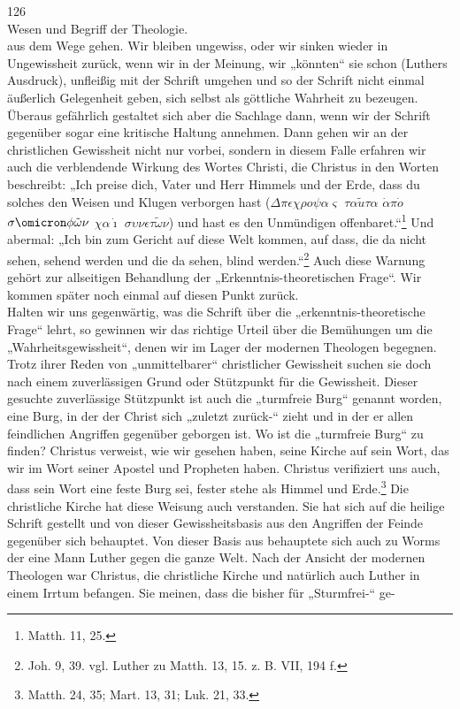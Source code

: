 126 \\ Wesen und Begriff der Theologie.\\ aus dem Wege gehen. Wir bleiben ungewiss, oder wir sinken wieder in Ungewissheit zurück, wenn wir in der Meinung, wir „könnten“ sie schon (Luthers Ausdruck), unfleißig mit der Schrift umgehen und so der Schrift nicht einmal äußerlich Gelegenheit geben, sich selbst als göttliche Wahrheit zu bezeugen. Überaus gefährlich gestaltet sich aber die Sachlage dann, wenn wir der Schrift gegenüber sogar eine kritische Haltung annehmen. Dann gehen wir an der christlichen Gewissheit nicht nur vorbei, sondern in diesem Falle erfahren wir auch die verblendende Wirkung des Wortes Christi, die Christus in den Worten beschreibt: „Ich preise dich, Vater und Herr Himmels und der Erde, dass du solches den Weisen und Klugen verborgen hast ($\Delta\pi\epsilon\chi\rho o\psi\alpha\varsigma$ $\tau\alpha\tilde{u}\tau\alpha$ $\dot{\alpha}\pi\dot{o}$ $\sigma\omicron\phi\tilde{\omega}\nu$ $\chi\alpha\dot{\imath}$ $\sigma\upsilon\nu\epsilon\tau\tilde{\omega}\nu$) und hast es den Unmündigen offenbaret.“\footnote{Matth. 11, 25.} Und abermal: „Ich bin zum Gericht auf diese Welt kommen, auf dass, die da nicht sehen, sehend werden und die da sehen, blind werden.“\footnote{Joh. 9, 39. vgl. Luther zu Matth. 13, 15. z. B. VII, 194 f.} Auch diese Warnung gehört zur allseitigen Behandlung der „Erkenntnis-theoretischen Frage“. Wir kommen später noch einmal auf diesen Punkt zurück.\\ Halten wir uns gegenwärtig, was die Schrift über die „erkenntnis-theoretische Frage“ lehrt, so gewinnen wir das richtige Urteil über die Bemühungen um die „Wahrheitsgewissheit“, denen wir im Lager der modernen Theologen begegnen. Trotz ihrer Reden von „unmittelbarer“ christlicher Gewissheit suchen sie doch nach einem zuverlässigen Grund oder Stützpunkt für die Gewissheit. Dieser gesuchte zuverlässige Stützpunkt ist auch die „turmfreie Burg“ genannt worden, eine Burg, in der der Christ sich „zuletzt zurück-“ zieht und in der er allen feindlichen Angriffen gegenüber geborgen ist. Wo ist die „turmfreie Burg“ zu finden? Christus verweist, wie wir gesehen haben, seine Kirche auf sein Wort, das wir im Wort seiner Apostel und Propheten haben. Christus verifiziert uns auch, dass sein Wort eine feste Burg sei, fester stehe als Himmel und Erde.\footnote{Matth. 24, 35; Mart. 13, 31; Luk. 21, 33.} Die christliche Kirche hat diese Weisung auch verstanden. Sie hat sich auf die heilige Schrift gestellt und von dieser Gewissheitsbasis aus den Angriffen der Feinde gegenüber sich behauptet. Von dieser Basis aus behauptete sich auch zu Worms der eine Mann Luther gegen die ganze Welt. Nach der Ansicht der modernen Theologen war Christus, die christliche Kirche und natürlich auch Luther in einem Irrtum befangen. Sie meinen, dass die bisher für „Sturmfrei-“ ge-